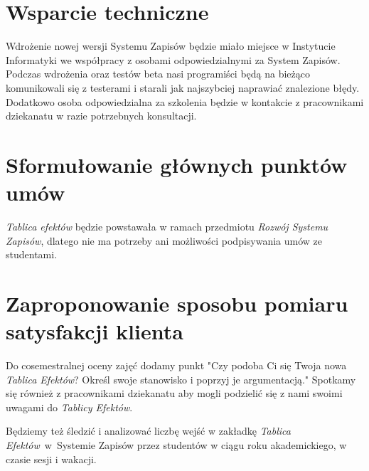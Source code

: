 \documentclass{article}
\newcommand{\TaE}{\textit{Tablica Efektów}}
\newcommand{\TyE}{\textit{Tablicy Efektów}}
\begin{document}
\section{Wsparcie techniczne}
Wdrożenie nowej wersji Systemu Zapisów będzie miało miejsce w Instytucie Informatyki we współpracy z osobami odpowiedzialnymi za System Zapisów.
Podczas wdrożenia oraz testów beta nasi programiści będą na bieżąco komunikowali się z testerami i starali jak najszybciej naprawiać znalezione błędy.
Dodatkowo osoba odpowiedzialna za szkolenia będzie w kontakcie z pracownikami dziekanatu w razie potrzebnych konsultacji.

\section{Sformułowanie głównych punktów umów}
\textit{Tablica efektów} będzie powstawała w ramach przedmiotu \textit{Rozwój Systemu Zapisów}, dlatego nie ma potrzeby ani możliwości podpisywania umów ze studentami.

\section{Zaproponowanie sposobu pomiaru satysfakcji klienta}
Do cosemestralnej oceny zajęć dodamy punkt "Czy podoba Ci się Twoja nowa \TaE? Określ swoje stanowisko i poprzyj je argumentacją." Spotkamy się również z pracownikami dziekanatu 
aby mogli podzielić się z nami swoimi uwagami do \TyE. 

Będziemy też śledzić i analizować liczbę wejść w zakładkę \TaE\ w~Systemie Zapisów przez studentów w ciągu roku akademickiego, w czasie sesji i wakacji.
\end{document}

